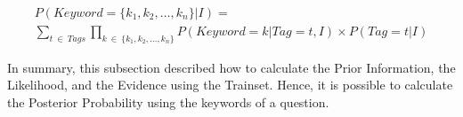 \begin{multline} \label{eq:evidenceMult}
    P(Keyword=\{k_{1},k_{2}, \dots , k_{n}\} | I) = \\
    \sum_{t \: \in \: Tags} \prod_{k \: \in \: \{k_{1},k_{2}, \dots , k_{n}\}} P(Keyword=k | Tag=t,I) \times P(Tag=t | I) 
\end{multline}

In summary, this subsection described how to calculate the Prior Information, the Likelihood, and the Evidence using the Trainset.
Hence, it is possible to calculate the Posterior Probability using the keywords of a question.



